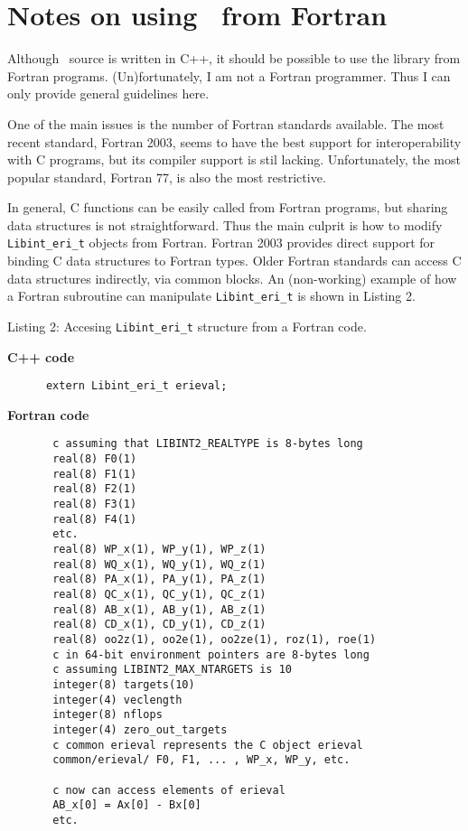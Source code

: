 \documentclass[12pt]{article}
\begin{document}
\section{\label{sec:fort} Notes on using \LIBINT\ from Fortran}

Although \LIBINT\ source is written in C++, it should be possible to use the library
from Fortran programs. (Un)fortunately, I am not a Fortran programmer. Thus I can
only provide general guidelines here.

One of the main issues is the number of Fortran standards available. The most recent standard, Fortran 2003,
seems to have the best support for interoperability with C programs, but its compiler support is stil lacking.
Unfortunately, the most popular standard, Fortran 77, is also the most restrictive.

In general, C functions can be easily called from Fortran programs, but sharing data structures
is not straightforward. Thus the main culprit is how to modify  {\tt Libint\_eri\_t} objects
from Fortran. Fortran 2003 provides direct support for binding C data structures to
Fortran types. Older Fortran standards can access C data structures indirectly, via
common blocks. An (non-working) example of how a Fortran subroutine can manipulate {\tt Libint\_eri\_t}
is shown in Listing 2.

\begin{footnotesize}
Listing 2: Accesing {\tt Libint\_eri\_t} structure from a Fortran code.

{\bf C++ code}
\begin{verbatim}
      extern Libint_eri_t erieval;
\end{verbatim}

{\bf Fortran code}
\begin{verbatim}
       c assuming that LIBINT2_REALTYPE is 8-bytes long
       real(8) F0(1)
       real(8) F1(1)
       real(8) F2(1)
       real(8) F3(1)
       real(8) F4(1)
       etc.
       real(8) WP_x(1), WP_y(1), WP_z(1)
       real(8) WQ_x(1), WQ_y(1), WQ_z(1)
       real(8) PA_x(1), PA_y(1), PA_z(1)
       real(8) QC_x(1), QC_y(1), QC_z(1)
       real(8) AB_x(1), AB_y(1), AB_z(1)
       real(8) CD_x(1), CD_y(1), CD_z(1)
       real(8) oo2z(1), oo2e(1), oo2ze(1), roz(1), roe(1)
       c in 64-bit environment pointers are 8-bytes long
       c assuming LIBINT2_MAX_NTARGETS is 10
       integer(8) targets(10)
       integer(4) veclength
       integer(8) nflops
       integer(4) zero_out_targets
       c common erieval represents the C object erieval
       common/erieval/ F0, F1, ... , WP_x, WP_y, etc.

       c now can access elements of erieval
       AB_x[0] = Ax[0] - Bx[0]
       etc.
\end{verbatim}
\end{footnotesize}
\end{document}
